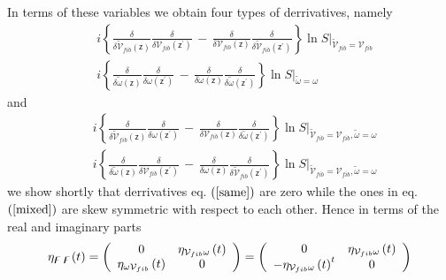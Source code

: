 \documentclass[aps,preprint]{revtex4}%
\begin{document}
In terms of these variables we obtain four types of derrivatives, namely%
\begin{align}
&  i\left\{  \frac{\delta}{\delta\mathcal{\tilde{V}}_{fib}(\mathsf{z})}%
\frac{\delta}{\delta\mathcal{V}_{fib}(\mathsf{z}^{\prime})}\,-\,\frac{\delta
}{\delta\mathcal{V}_{fib}(\mathsf{z})}\frac{\delta}{\delta\mathcal{\tilde{V}%
}_{fib}(\mathsf{z}^{\prime})}\right\}  \ln S|_{\mathcal{\tilde{V}}%
_{fib}=\mathcal{V}_{fib}}\nonumber\\
&  i\left\{  \frac{\delta}{\delta\mathcal{\tilde{\omega}}(\mathsf{z})}%
\frac{\delta}{\delta\mathcal{\omega}(\mathsf{z}^{\prime})}\,-\,\frac{\delta
}{\delta\mathcal{\omega}(\mathsf{z})}\frac{\delta}{\delta\mathcal{\tilde
{\omega}}(\mathsf{z}^{\prime})}\right\}  \ln S|_{\mathcal{\tilde{\omega}%
}=\mathcal{\omega}} \label{same}%
\end{align}
and%
\begin{align}
&  i\left\{  \frac{\delta}{\delta\mathcal{\tilde{V}}_{fib}(\mathsf{z})}%
\frac{\delta}{\delta\mathcal{\omega}(\mathsf{z}^{\prime})}\,-\,\frac{\delta
}{\delta\mathcal{V}_{fib}(\mathsf{z})}\frac{\delta}{\delta\mathcal{\tilde
{\omega}}(\mathsf{z}^{\prime})}\right\}  \ln S|_{\mathcal{\tilde{V}}%
_{fib}=\mathcal{V}_{fib},\mathcal{\tilde{\omega}}=\mathcal{\omega}}\nonumber\\
&  i\left\{  \frac{\delta}{\delta\mathcal{\tilde{\omega}}(\mathsf{z})}%
\frac{\delta}{\delta\mathcal{V}_{fib}(\mathsf{z}^{\prime})}\,-\,\frac{\delta
}{\delta\mathcal{\omega}(\mathsf{z})}\frac{\delta}{\delta\mathcal{\tilde{V}%
}_{fib}(\mathsf{z}^{\prime})}\right\}  \ln S|_{\mathcal{\tilde{V}}%
_{fib}=\mathcal{V}_{fib},\mathcal{\tilde{\omega}}=\mathcal{\omega}}
\label{mixed}%
\end{align}
we show shortly that derrivatives eq. $\left(  \ref{same}\right)  $ are zero
while the ones in eq. $\left(  \ref{mixed}\right)  $ are skew symmetric with
respect to each other. Hence in terms of the real and imaginary parts
\begin{equation}
\eta_{\mathbf{\digamma\,\digamma}}(t)=\left(
\begin{array}
[c]{cc}%
0 & \eta_{\mathcal{V}_{fib}\omega}\left(  t\right) \\
\eta_{\omega\mathcal{V}_{fib}}\left(  t\right)  & 0
\end{array}
\right)  =\left(
\begin{array}
[c]{cc}%
0 & \eta_{\mathcal{V}_{fib}\omega}\left(  t\right) \\
-\eta_{\mathcal{V}_{fib}\omega}\left(  t\right)  ^{t} & 0
\end{array}
\right)  \label{reim}%
\end{equation}
\end{document}
